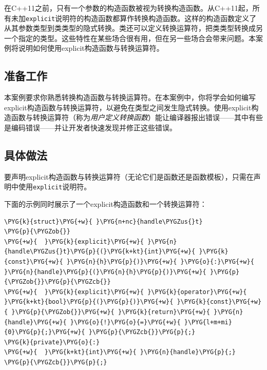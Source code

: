 
在C++11之前，只有一个参数的构造函数被视为转换构造函数。从C++11起，所有未加\texttt{explicit}说明符的构造函数都算作转换构造函数。这样的构造函数定义了从其参数类型到类类型的隐式转换。类还可以定义转换运算符，把类类型转换成另一个指定的类型。这些特性在某些场合很有用，但在另一些场合会带来问题。本案例将说明如何使用explicit构造函数与转换运算符。



\subsection{准备工作}



本案例要求你熟悉转换构造函数与转换运算符。在本案例中，你将学会如何编写explicit构造函数与转换运算符，以避免在类型之间发生隐式转换。使用explicit构造函数与转换运算符（称为\textit{用户定义转换函数}）能让编译器报出错误——其中有些是编码错误——并让开发者快速发现并修正这些错误。



\subsection{具体做法}



要声明explicit构造函数与转换运算符（无论它们是函数还是函数模板），只需在声明中使用\texttt{explicit}说明符。



下面的示例同时展示了一个explicit构造函数和一个转换运算符：



\begin{codeblockbg}
\begin{Verbatim}[commandchars=\\\{\},breaklines=true,breakanywhere=true,fontsize=\codefont,xleftmargin=17bp]
\PYG{k}{struct}\PYG{+w}{ }\PYG{n+nc}{handle\PYGZus{}t}
\PYG{p}{\PYGZob{}}
\PYG{+w}{  }\PYG{k}{explicit}\PYG{+w}{ }\PYG{n}{handle\PYGZus{}t}\PYG{p}{(}\PYG{k+kt}{int}\PYG{+w}{ }\PYG{k}{const}\PYG{+w}{ }\PYG{n}{h}\PYG{p}{)}\PYG{+w}{ }\PYG{o}{:}\PYG{+w}{ }\PYG{n}{handle}\PYG{p}{(}\PYG{n}{h}\PYG{p}{)}\PYG{+w}{ }\PYG{p}{\PYGZob{}}\PYG{p}{\PYGZcb{}}
\PYG{+w}{  }\PYG{k}{explicit}\PYG{+w}{ }\PYG{k}{operator}\PYG{+w}{ }\PYG{k+kt}{bool}\PYG{p}{(}\PYG{p}{)}\PYG{+w}{ }\PYG{k}{const}\PYG{+w}{ }\PYG{p}{\PYGZob{}}\PYG{+w}{ }\PYG{k}{return}\PYG{+w}{ }\PYG{n}{handle}\PYG{+w}{ }\PYG{o}{!}\PYG{o}{=}\PYG{+w}{ }\PYG{l+m+mi}{0}\PYG{p}{;}\PYG{+w}{ }\PYG{p}{\PYGZcb{}}\PYG{p}{;}
\PYG{k}{private}\PYG{o}{:}
\PYG{+w}{  }\PYG{k+kt}{int}\PYG{+w}{ }\PYG{n}{handle}\PYG{p}{;}
\PYG{p}{\PYGZcb{}}\PYG{p}{;}
\end{Verbatim}
\end{codeblockbg}


